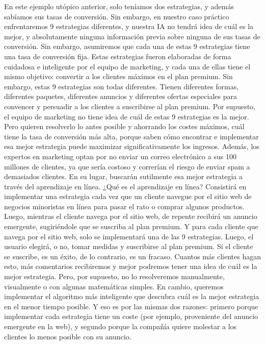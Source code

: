 \documentclass[]{book}
\begin{document}
En este ejemplo utópico anterior, solo teníamos dos estrategias, y además sabíamos sus tasas de conversión. Sin embargo, en nuestro caso práctico enfrentaremos 9 estrategias diferentes, y nuestra IA no tendrá idea de cuál es la mejor, y absolutamente ninguna información previa sobre ninguna de sus tasas de conversión. Sin embargo, asumiremos que cada una de estas 9 estrategias tiene una tasa de conversión fija. Estas estrategias fueron elaboradas de forma cuidadosa e inteligente por el equipo de marketing, y cada una de ellas tiene el mismo objetivo: convertir a los clientes máximos en el plan premium. Sin embargo, estas 9 estrategias son todas diferentes. Tienen diferentes formas, diferentes paquetes, diferentes anuncios y diferentes ofertas especiales para convencer y persuadir a los clientes a suscribirse al plan premium. Por supuesto, el equipo de marketing no tiene idea de cuál de estas 9 estrategias es la mejor. Pero quieren resolverlo lo antes posible y ahorrando los costes máximos, cuál tiene la tasa de conversión más alta, porque saben cómo encontrar e implementar esa mejor estrategia puede maximizar significativamente los ingresos. Además, los expertos en marketing optan por no enviar un correo electrónico a sus 100 millones de clientes, ya que sería costoso y correrían el riesgo de enviar spam a demasiados clientes. En su lugar, buscarán sutilmente esa mejor estrategia a través del aprendizaje en línea. ¿Qué es el aprendizaje en línea? Consistirá en implementar una estrategia cada vez que un cliente navegue por el sitio web de negocios minoristas en línea para pasar el rato o comprar algunos productos. Luego, mientras el cliente navega por el sitio web, de repente recibirá un anuncio emergente, sugiriéndole que se suscriba al plan premium. Y para cada cliente que navega por el sitio web, solo se implementará una de las 9 estrategias. Luego, el usuario elegirá, o no, tomar medidas y suscribirse al plan premium. Si el cliente se suscribe, es un éxito, de lo contrario, es un fracaso. Cuantos más clientes hagan esto, más comentarios recibiremos y mejor podremos tener una idea de cuál es la mejor estrategia. Pero, por supuesto, no lo resolveremos manualmente, visualmente o con algunas matemáticas simples. En cambio, queremos implementar el algoritmo más inteligente que descubra cuál es la mejor estrategia en el menor tiempo posible. Y eso es por las mismas dos razones: primero porque implementar cada estrategia tiene un coste (por ejemplo, proveniente del anuncio emergente en la web), y segundo porque la compañía quiere molestar a los clientes lo menos posible con su anuncio.
\end{document}

